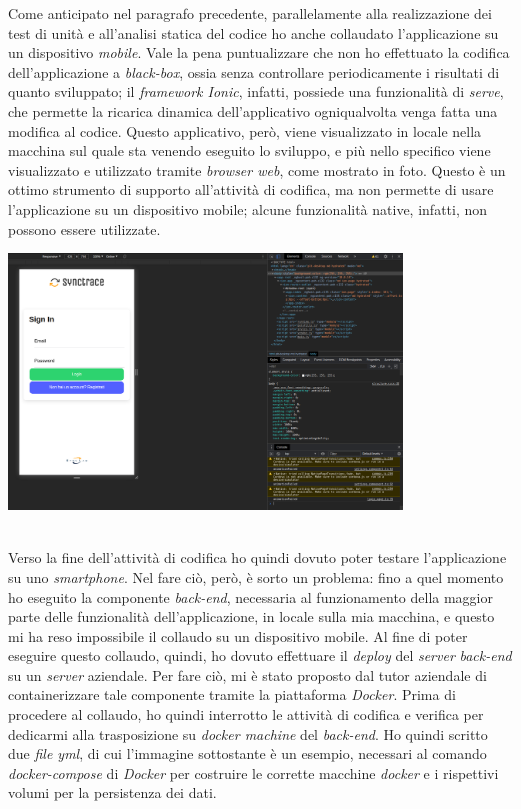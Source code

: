 Come anticipato nel paragrafo precedente, parallelamente alla realizzazione dei test di unità e all'analisi statica del codice ho anche collaudato l'applicazione su un dispositivo \textit{mobile}. Vale la pena puntualizzare che non ho effettuato la codifica dell'applicazione a \textit{black-box}, ossia senza controllare periodicamente i risultati di quanto sviluppato; il \textit{framework Ionic}, infatti, possiede una funzionalità di \textit{serve}, che permette la ricarica dinamica dell'applicativo ogniqualvolta venga fatta una modifica al codice. Questo applicativo, però, viene visualizzato in locale nella macchina sul quale sta venendo eseguito lo sviluppo, e più nello specifico viene visualizzato e utilizzato tramite \textit{browser web}, come mostrato in foto. Questo è un ottimo strumento di supporto all'attività di codifica, ma non permette di usare l'applicazione su un dispositivo mobile; alcune funzionalità native, infatti, non possono essere utilizzate. \newpage

\begin{minipage}{\linewidth}
  \centering
    \includegraphics[height=6.8cm]{immagini/ionicserve}
\end{minipage} \\


Verso la fine dell'attività di codifica ho quindi dovuto poter testare l'applicazione su uno \textit{smartphone}. Nel fare ciò, però, è sorto un problema: fino a quel momento ho eseguito la componente \textit{back-end}, necessaria al funzionamento della maggior parte delle funzionalità dell'applicazione, in locale sulla mia macchina, e questo mi ha reso impossibile il collaudo su un dispositivo mobile. Al fine di poter eseguire questo collaudo, quindi, ho dovuto effettuare il \textit{deploy} del \textit{server} \textit{back-end} su un \textit{server} aziendale. Per fare ciò, mi è stato proposto dal tutor aziendale di containerizzare tale componente tramite la piattaforma \textit{Docker}. Prima di procedere al collaudo, ho quindi interrotto le attività di codifica e verifica per dedicarmi alla trasposizione su \textit{docker machine} del \textit{back-end}. Ho quindi scritto due \textit{file yml}, di cui l'immagine sottostante è un esempio, necessari al comando \textit{docker-compose} di \textit{Docker} per costruire le corrette macchine \textit{docker} e i rispettivi volumi per la persistenza dei dati. \\

